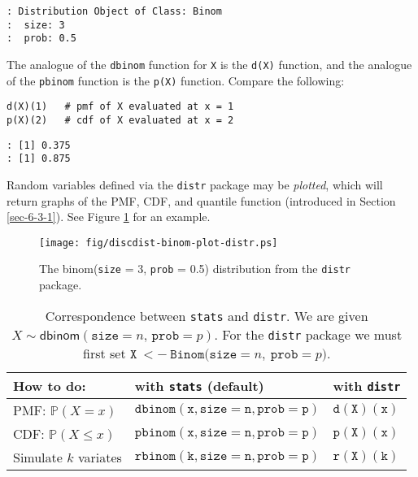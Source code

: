 \begin{verbatim}
: Distribution Object of Class: Binom
:  size: 3
:  prob: 0.5
\end{verbatim}

The analogue of the \texttt{dbinom} function for \texttt{X} is the \texttt{d(X)} function,
and the analogue of the \texttt{pbinom} function is the \texttt{p(X)}
function. Compare the following:

\begin{verbatim}
d(X)(1)   # pmf of X evaluated at x = 1
p(X)(2)   # cdf of X evaluated at x = 2
\end{verbatim}

\begin{verbatim}
: [1] 0.375
: [1] 0.875
\end{verbatim}



Random variables defined via the \texttt{distr} package \cite{distr} may be
\emph{plotted}, which will return graphs of the PMF, CDF, and quantile
function (introduced in Section \ref{sec-6-3-1}). See
Figure \ref{fig-binom-plot-distr} for an example.

\begin{figure}[ht!]
\centering
\texttt{[image: fig/discdist-binom-plot-distr.ps]}
\caption[The \textsf{binom}(\texttt{size} = 3, \texttt{prob} = 0.5) distribution from the \texttt{distr} package]{\label{fig-binom-plot-distr}\small The \textsf{binom}(\texttt{size} = 3, \texttt{prob} = 0.5) distribution from the \texttt{distr} package.}
\end{figure}


\begin{table}[htb]
\caption[Correspondence between \texttt{stats} and \texttt{distr}]{Correspondence between \texttt{stats} and \texttt{distr}. We are given \(X\sim\mathsf{dbinom}(\mathtt{size}=n,\,\mathtt{prob}=p)\).  For the \texttt{distr} package we must first set \(\mathtt{X\ <-\ Binom(size=}n\mathtt{,\ prob=}p\mathtt{)}\).}
\centering
\begin{tabular}{lll}
How to do: & with \texttt{stats} (default) & with \texttt{distr}\\
\hline
PMF: \(\mathbb{P}(X=x)\) & \(\mathtt{dbinom(x,size=n,prob=p)}\) & \(\mathtt{d(X)(x)}\)\\
CDF:  \(\mathbb{P}(X\leq x)\) & \(\mathtt{pbinom(x,size=n,prob=p)}\) & \(\mathtt{p(X)(x)}\)\\
Simulate \(k\) variates & \(\mathtt{rbinom(k,size=n,prob=p)}\) & \(\mathtt{r(X)(k)}\)\\
\hline
\end{tabular}
\end{table}

